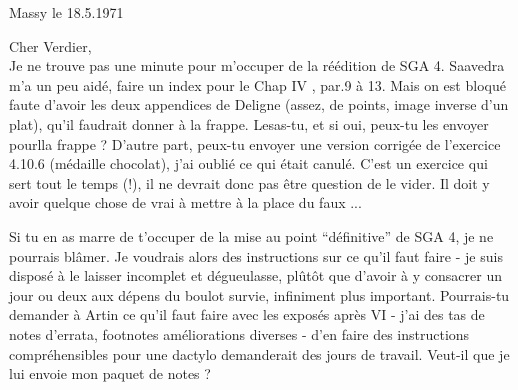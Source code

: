 \begin{flushright}
Massy le 18.5.1971\\
\end{flushright}
Cher Verdier,\\

Je ne trouve pas une minute pour m'occuper de la réédition de SGA 4. Saavedra m'a un peu aidé,  faire un index pour le Chap IV , par.9 à 13. Mais on est bloqué faute d'avoir les deux appendices de Deligne (assez, de points, image inverse d'un plat), qu'il faudrait donner à la frappe. Lesas-tu, et si oui, peux-tu les envoyer pourlla frappe ? D'autre part, peux-tu envoyer une version corrigée de l'exercice 4.10.6 (médaille chocolat), j'ai  oublié ce qui était canulé. C'est un exercice qui sert tout le temps (!), il ne devrait donc pas être question de le vider. Il doit y avoir quelque chose de vrai à mettre à la place du faux ...

Si tu en as marre de t'occuper de la mise au point ``définitive'' de SGA 4, je ne pourrais  blâmer. Je voudrais alors des instructions sur ce qu'il faut faire - je suis disposé à le laisser incomplet et dégueulasse, plûtôt que d'avoir à  y consacrer un jour ou deux aux dépens du boulot survie, infiniment plus important. Pourrais-tu demander à Artin ce qu'il faut faire avec les exposés après VI - j'ai des tas de notes d'errata, footnotes améliorations diverses - d'en faire des instructions compréhensibles pour une dactylo demanderait des jours de travail. Veut-il que je lui envoie mon paquet de notes ?
